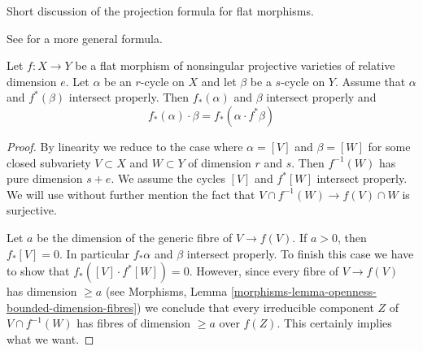 \noindent
Short discussion of the projection formula for flat morphisms.

\begin{lemma}
\label{lemma-projection-formula-flat}
\begin{reference}
See \cite[Chapter V, Section 7, formula (10)]{Serre_algebre_locale}
for a more general formula.
\end{reference}
Let $f : X \to Y$ be a flat morphism of nonsingular projective varieties
of relative dimension $e$. Let $\alpha$ be an $r$-cycle on $X$ and let
$\beta$ be a $s$-cycle on $Y$. Assume that $\alpha$ and $f^*(\beta)$ intersect
properly. Then $f_*(\alpha)$ and $\beta$ intersect properly and
$$
f_*(\alpha) \cdot \beta = f_*( \alpha \cdot f^*\beta)
$$
\end{lemma}

\begin{proof}
By linearity we reduce to the case where $\alpha = [V]$ and
$\beta = [W]$ for some closed subvariety $V \subset X$ and
$W \subset Y$ of dimension $r$ and $s$. Then $f^{-1}(W)$ has
pure dimension $s + e$. We assume the cycles
$[V]$ and $f^*[W]$ intersect properly. We will use without
further mention the fact that $V \cap f^{-1}(W) \to f(V) \cap W$
is surjective.

\medskip\noindent
Let $a$ be the dimension of the generic fibre of $V \to f(V)$.
If $a > 0$, then $f_*[V] = 0$. In particular $f_*\alpha$ and $\beta$
intersect properly. To finish this case we have to show that
$f_*([V] \cdot f^*[W]) = 0$. However, since every fibre of
$V \to f(V)$ has dimension $\geq a$ (see
Morphisms, Lemma \ref{morphisms-lemma-openness-bounded-dimension-fibres})
we conclude that every irreducible component $Z$ of $V \cap f^{-1}(W)$
has fibres of dimension $\geq a$ over $f(Z)$. This certainly
implies what we want.


\end{proof}
